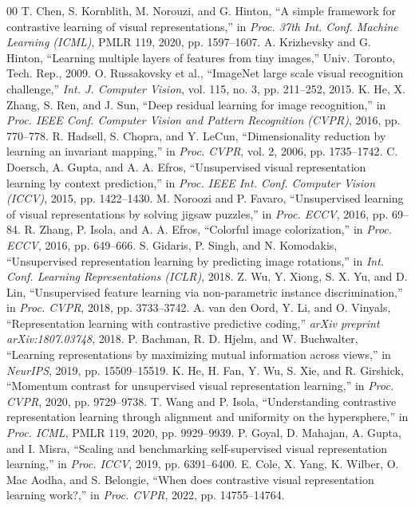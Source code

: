 \documentclass[conference]{IEEEtran}
\begin{document}
\begin{thebibliography}{00}
 T. Chen, S. Kornblith, M. Norouzi, and G. Hinton, ``A simple framework for contrastive learning of visual representations,'' in \textit{Proc. 37th Int. Conf. Machine Learning (ICML)}, PMLR 119, 2020, pp. 1597--1607.
 A. Krizhevsky and G. Hinton, ``Learning multiple layers of features from tiny images,'' Univ. Toronto, Tech. Rep., 2009.
 O. Russakovsky et al., ``ImageNet large scale visual recognition challenge,'' \textit{Int. J. Computer Vision}, vol. 115, no. 3, pp. 211--252, 2015.
 K. He, X. Zhang, S. Ren, and J. Sun, ``Deep residual learning for image recognition,'' in \textit{Proc. IEEE Conf. Computer Vision and Pattern Recognition (CVPR)}, 2016, pp. 770--778.
 R. Hadsell, S. Chopra, and Y. LeCun, ``Dimensionality reduction by learning an invariant mapping,'' in \textit{Proc. CVPR}, vol. 2, 2006, pp. 1735--1742.
 C. Doersch, A. Gupta, and A. A. Efros, ``Unsupervised visual representation learning by context prediction,'' in \textit{Proc. IEEE Int. Conf. Computer Vision (ICCV)}, 2015, pp. 1422--1430.
 M. Noroozi and P. Favaro, ``Unsupervised learning of visual representations by solving jigsaw puzzles,'' in \textit{Proc. ECCV}, 2016, pp. 69--84.
 R. Zhang, P. Isola, and A. A. Efros, ``Colorful image colorization,'' in \textit{Proc. ECCV}, 2016, pp. 649--666.
 S. Gidaris, P. Singh, and N. Komodakis, ``Unsupervised representation learning by predicting image rotations,'' in \textit{Int. Conf. Learning Representations (ICLR)}, 2018.
 Z. Wu, Y. Xiong, S. X. Yu, and D. Lin, ``Unsupervised feature learning via non-parametric instance discrimination,'' in \textit{Proc. CVPR}, 2018, pp. 3733--3742.
 A. van den Oord, Y. Li, and O. Vinyals, ``Representation learning with contrastive predictive coding,'' \textit{arXiv preprint arXiv:1807.03748}, 2018.
 P. Bachman, R. D. Hjelm, and W. Buchwalter, ``Learning representations by maximizing mutual information across views,'' in \textit{NeurIPS}, 2019, pp. 15509--15519.
 K. He, H. Fan, Y. Wu, S. Xie, and R. Girshick, ``Momentum contrast for unsupervised visual representation learning,'' in \textit{Proc. CVPR}, 2020, pp. 9729--9738.
 T. Wang and P. Isola, ``Understanding contrastive representation learning through alignment and uniformity on the hypersphere,'' in \textit{Proc. ICML}, PMLR 119, 2020, pp. 9929--9939.
 P. Goyal, D. Mahajan, A. Gupta, and I. Misra, ``Scaling and benchmarking self-supervised visual representation learning,'' in \textit{Proc. ICCV}, 2019, pp. 6391--6400.
 E. Cole, X. Yang, K. Wilber, O. Mac Aodha, and S. Belongie, ``When does contrastive visual representation learning work?,'' in \textit{Proc. CVPR}, 2022, pp. 14755--14764.
\end{thebibliography}
\end{document}
